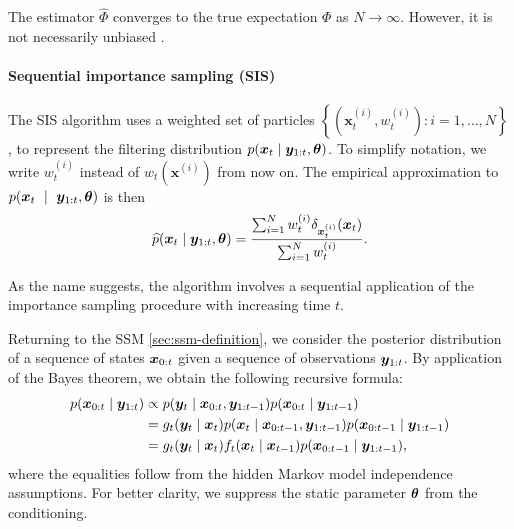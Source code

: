 The estimator $\widehat{\Phi}$ converges to the true expectation $\Phi$ as $N \to \infty$. However, it is not necessarily unbiased \citep{information-theory}.


\paragraph{Sequential importance sampling (SIS)}
The SIS algorithm uses a weighted set of particles $\left\{\left(\bm{x}_t^{(i)}, w_t^{(i)} \right) : i = 1, \ldots, N \right\}$, to represent the filtering distribution $p(\bm{x}_t \mid \bm{y}_{1:t}, \bm{\theta})$. To simplify notation, we write $w_t^{(i)}$ instead of $w_t(\bm{x}^{(i)})$ from now on. The empirical approximation to $p(\bm{x}_t~\mid~\bm{y}_{1:t}, \bm{\theta})$ is then
\begin{equation*}
\widehat{p}(\bm{x}_t \mid \bm{y}_{1:t}, \bm{\theta}) = \frac{\sum_{i=1}^N w_t^{(i)} \delta_{\bm{x}_t^{(i)}}(\bm{x}_t)}{\sum_{i=1}^N w_t^{(i)}}.
\end{equation*}

As the name suggests, the algorithm involves a sequential application of the importance sampling procedure with increasing time $t$.

Returning to the SSM \eqref{sec:ssm-definition}, we consider the posterior distribution of a sequence of states $\bm{x}_{0:t}$ given a sequence of observations $\bm{y}_{1:t}$. By application of the Bayes theorem, we obtain the following recursive formula:
\begin{equation*}
\begin{split}
p(\bm{x}_{0:t} \mid \bm{y}_{1:t}) & \propto p(\bm{y}_t \mid \bm{x}_{0:t}, \bm{y}_{1:t-1}) p(\bm{x}_{0:t} \mid \bm{y}_{1:t-1}) \\
&= g_t(\bm{y}_t \mid \bm{x}_t) p(\bm{x}_t \mid \bm{x}_{0:t-1}, \bm{y}_{1:t-1}) p(\bm{x}_{0:t-1} \mid \bm{y}_{1:t-1}) \\
&= g_t(\bm{y}_t \mid \bm{x}_t) f_t(\bm{x}_t \mid \bm{x}_{t-1}) p(\bm{x}_{0:t-1} \mid \bm{y}_{1:t-1}),
\end{split}
\end{equation*}
where the equalities follow from the hidden Markov model independence assumptions. For better clarity, we suppress the static parameter $\bm{\theta}$ from the conditioning.

